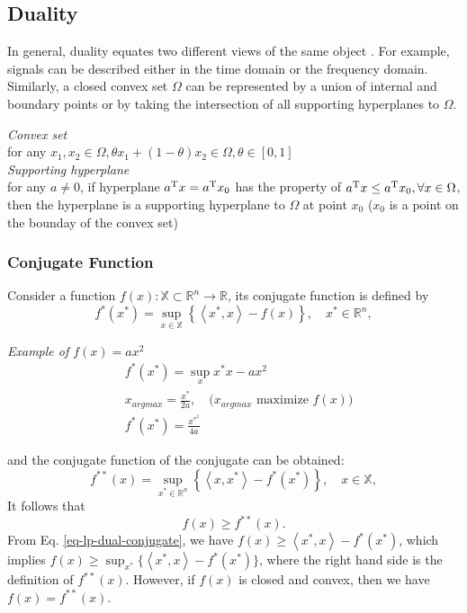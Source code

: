 \documentclass[letterpaper, 11pt]{article}
\providecommand{\nums}[2]{\ensuremath{\mathbb{#1}^{#2}}}
\providecommand{\trans}[1]{\ensuremath{{#1}^{\rm T}}}
\numberwithin{equation}{section}
\begin{document}
\subsection{Duality}
\label{sec:orgbb24eba}
In general, duality equates two different views of the same object \cite{bertsekas2003convex}. For example, signals can be described either in the time
domain or the frequency domain. Similarly, a closed convex set \(\Omega\) can be represented by a union of internal and boundary points or by taking the
intersection of all supporting hyperplanes to \(\Omega\).
\begin{margintable}
{\footnotesize
\textit{Convex set} \\
for any $x_{1}, x_{2} \in \Omega, \theta x_{1} + (1 - \theta)x_{2} \in \Omega, \theta \in \left[0,1\right]$ \\
\textit{Supporting hyperplane} \\
for any $a \not = 0$, if hyperplane $\trans{a}x = \trans{a}x_{0}$ has the property of $\trans{a}x \leq \trans{a}x_{0}, 
\forall x \in \Omega$, then the hyperplane is a supporting hyperplane to $\Omega$ at point $x_0$ ($x_0$ is a point on the bounday of the convex set)
}
\end{margintable}
\subsubsection{Conjugate Function}
\label{sec:org7c3b7ef}
Consider a function \(f(x):\mathbb{X} \subset \nums{R}{n} \rightarrow \mathbb{R}\), its conjugate function is defined by
\begin{equation}
\label{eq-lp-dual-conjugate}
f^*(x^{*}) = \sup_{x \in \mathbb{X}} \left \{ \left< x^{*},x \right> - f(x) \right \}, \quad x^{*} \in \nums{R}{n},
\end{equation}
\begin{margintable}
{\footnotesize
\vspace{20pt}
\textit{Example of $f(x) = ax^2$}
\begin{align*}
&f^*(x^{*}) = \sup_{x} x^{*} x - ax^2 \\
&x_{argmax} = \frac{x^{*}}{2a},\quad \text{($x_{argmax}$ maximize $f(x)$})\\
&f^*(x^{*}) = \frac{x^{*}^2}{4a} 
\end{align*}
}
\end{margintable}
and the conjugate function of the conjugate can be obtained:
\begin{equation}
\label{eq-lp-dual-conjugate-2}
f^{**}(x) = \sup_{x^{*} \in \nums{R}{n}} \left\{ \left< x,x^{*} \right> - f^*(x^{*}) \right \}, \quad x \in \mathbb{X},
\end{equation}
It follows that 
\begin{equation}
\label{eq-lp-dual-conjugate-3}
f(x) \geq f^{**}(x).
\end{equation}
From Eq. \ref{eq-lp-dual-conjugate}, we have \(f(x) \geq \left< x^*,x \right> - f^*(x^*)\), which implies \(f(x) \geq \sup_{x^*} \{\left< x^*,x
\right> - f^*(x^*)\}\), where the right hand side is the definition of \(f^{**}(x)\). However, if \(f(x)\) is closed and convex, then we have \(f(x) = f^{**}(x)\).
\end{document}
